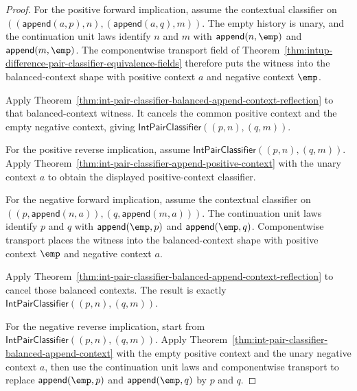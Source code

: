 \begin{proof}
For the positive forward implication, assume the contextual classifier on
$((\mathsf{append}(a,p),n),(\mathsf{append}(a,q),m))$. The empty history is
unary, and the continuation unit laws identify $n$ and $m$ with
$\mathsf{append}(n,\emp)$ and $\mathsf{append}(m,\emp)$. The componentwise
transport field of
Theorem~\ref{thm:intup-difference-pair-classifier-equivalence-fields}
therefore puts the witness into the balanced-context shape with positive
context $a$ and negative context $\emp$.

Apply
Theorem~\ref{thm:int-pair-classifier-balanced-append-context-reflection} to
that balanced-context witness. It cancels the common positive context and the
empty negative context, giving
$\mathsf{IntPairClassifier}((p,n),(q,m))$.

For the positive reverse implication, assume
$\mathsf{IntPairClassifier}((p,n),(q,m))$. Apply
Theorem~\ref{thm:int-pair-classifier-append-positive-context} with the unary
context $a$ to obtain the displayed positive-context classifier.

For the negative forward implication, assume the contextual classifier on
$((p,\mathsf{append}(n,a)),(q,\mathsf{append}(m,a)))$. The continuation unit
laws identify $p$ and $q$ with $\mathsf{append}(\emp,p)$ and
$\mathsf{append}(\emp,q)$. Componentwise transport places the witness into
the balanced-context shape with positive context $\emp$ and negative context
$a$.

Apply
Theorem~\ref{thm:int-pair-classifier-balanced-append-context-reflection} to
cancel those balanced contexts. The result is exactly
$\mathsf{IntPairClassifier}((p,n),(q,m))$.

For the negative reverse implication, start from
$\mathsf{IntPairClassifier}((p,n),(q,m))$. Apply
Theorem~\ref{thm:int-pair-classifier-balanced-append-context} with the empty
positive context and the unary negative context $a$, then use the continuation
unit laws and componentwise transport to replace
$\mathsf{append}(\emp,p)$ and $\mathsf{append}(\emp,q)$ by $p$ and $q$.
\end{proof}

